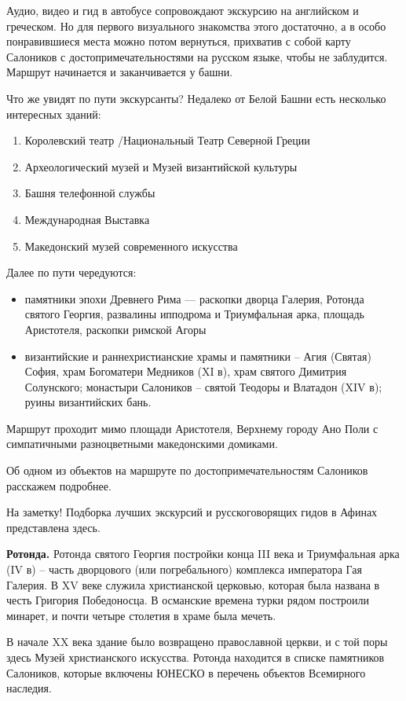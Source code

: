 Аудио, видео и гид в автобусе сопровождают экскурсию на английском и греческом. Но для первого визуального знакомства этого достаточно, а в особо понравившиеся места можно потом вернуться, прихватив с собой карту Салоников с достопримечательностями на русском языке, чтобы не заблудится. Маршрут начинается и заканчивается у башни.

Что же увидят по пути экскурсанты? Недалеко от Белой Башни есть несколько интересных зданий:
\begin{enumerate}
    \item Королевский театр /Национальный Театр Северной Греции
    \item Археологический музей и Музей византийской культуры
    \item Башня телефонной службы
    \item Международная Выставка
    \item Македонский музей современного искусства
\end{enumerate}
Далее по пути чередуются:
\begin{itemize}
    \item памятники эпохи Древнего Рима — раскопки дворца Галерия, Ротонда святого Георгия, развалины ипподрома и Триумфальная арка, площадь Аристотеля, раскопки римской Агоры
    \item византийские и раннехристианские храмы и памятники – Агия (Святая) София, храм Богоматери Медников (XI в), храм святого Димитрия Солунского; монастыри Салоников – святой Теодоры и Влатадон (XIV в); руины византийских бань.
\end{itemize}

Маршрут проходит мимо площади Аристотеля, Верхнему городу Ано Поли с симпатичными разноцветными македонскими домиками.

Об одном из объектов на маршруте по достопримечательностям Салоников расскажем подробнее.

На заметку! Подборка лучших экскурсий и русскоговорящих гидов в Афинах представлена здесь.

\textbf{Ротонда.} Ротонда святого Георгия постройки конца III века и Триумфальная арка (IV в) – часть дворцового (или погребального) комплекса императора Гая Галерия. В XV веке служила христианской церковью, которая была названа в честь Григория Победоносца. В османские времена турки рядом построили минарет, и почти четыре столетия в храме была мечеть.

В начале XX века здание было возвращено православной церкви, и с той поры здесь Музей христианского искусства. Ротонда находится в списке памятников Салоников, которые включены ЮНЕСКО в перечень объектов Всемирного наследия.

